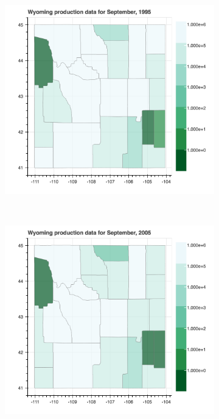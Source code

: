 \documentclass[11pt,letterpaper]{article}
\begin{document}
\begin{figure}[h!]
\begin{subfigure}{0.3\textwidth}
\includegraphics[width=1.2\linewidth]{wy_prod_1995}
\end{subfigure}
~
\begin{subfigure}{0.3\textwidth}
\includegraphics[width=1.2\linewidth]{wy_prod_2005}
\end{subfigure}
~
\begin{subfigure}{0.3\textwidth}

\end{subfigure}
\end{figure}
\end{document}
